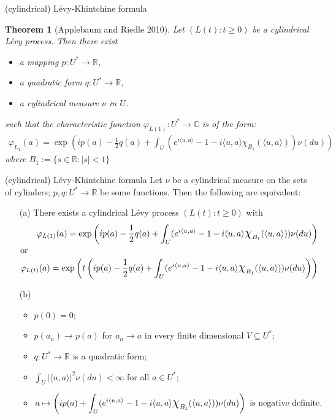 \documentclass[xcolor=dvipsnames,leqno]{beamer}
\newcommand*{\bigchi}{\mbox{\Large$\chi$}}
\newtheorem{thm}{Theorem}
\begin{document}
\begin{omitframe}
\begin{frame}{(cylindrical) L\'evy-Khintchine formula}
	\begin{thm}[Applebaum and Riedle 2010]%
		Let $(L(t) : t\geq 0)$ be a cylindrical L\'evy process. Then there exist
		\begin{itemize}
			\item a mapping $p : U^{*}\to\mathbb{R}$,
			\item a quadratic form $q : U^{*}\to\mathbb{R}$,
			\item a cylindrical measure $\nu$ in $U$.
		\end{itemize}
		such that the characteristic function $\varphi_{L(1)}: U^{*}\to\mathbb{C}$ is of the form:
	\begin{align*}
		\varphi_{L_{1}}(a)=\exp\left(ip(a)-\frac{1}{2}q(a)+\int_{U}(e^{i\langle u, a\rangle}-1-i\langle u, a\rangle\chi_{B_1}(\langle u, a\rangle))\nu(du)\right)
	\end{align*}
	where $B_1 :=\{s\in\mathbb{R}: |s|<1\}$
	\end{thm}
\end{frame}
\begin{frame}[shrink]{(cylindrical) L\'evy-Khintchine formula}
	Let $\nu$ be a cylindrical measure on the sets of cylinders; $p, q: U^{*}\to\mathbb{R}$ be some functions.
	Then the following are equivalent:
	\begin{itemize}
		\item[(a)] There exists a cylindrical L\'evy process $(L(t) : t\geq 0)$ with
		\begin{align*}
			\varphi_{L(1)}(a)=\exp\left(ip(a)-\frac{1}{2}q(a)+\int_{U}(e^{i\langle u, a\rangle}-1-i\langle u, a\rangle\bigchi_{B_1}(\langle u, a\rangle))\nu(du)\right)\\
			\intertext{or}
			\varphi_{L(t)}(a)=\exp\left(t\left(ip(a)-\frac{1}{2}q(a)+\int_{U}(e^{i\langle u, a\rangle}-1-i\langle u, a\rangle\bigchi_{B_1}(\langle u, a\rangle))\nu(du)\right)\right)
		\end{align*}
		\item[(b)]     
		\begin{itemize}
			\item $p(0)=0$;
			\item $p(a_n)\to p(a)$ for $a_n\to a$ in every finite dimensional $V\subseteq U^{*}$;
			\item $q: U^{*}\to\mathbb{R}$ is a quadratic form;
			\item $\int_{U}|\langle u, a\rangle|^2\nu(du)<\infty$ for all $a\in U^{*}$;
			\item 
			\begin{align*}
		a\mapsto\left(ip(a)+\int_{U}(e^{i\langle u, a\rangle}-1
		-i\langle u, a\rangle\bigchi_{B_1}(\langle u, a\rangle))\nu(du)\right) \text{   is negative definite.		}
			\end{align*}		  
		\end{itemize}
	\end{itemize}
\end{frame}
\end{omitframe}
\end{document}
